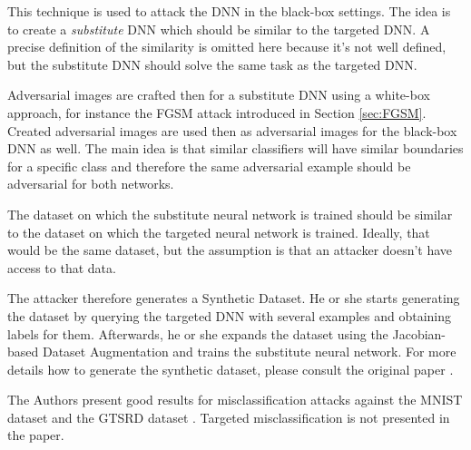 This technique is used to attack the DNN in the black-box settings. The idea is to create a \textit{substitute} DNN which should be similar to the targeted DNN. A precise definition of the similarity is omitted here because it's not well defined, but the substitute DNN should solve the same task as the targeted DNN.

Adversarial images are crafted then for a substitute DNN using a white-box approach, for instance the FGSM attack introduced in Section \ref{sec:FGSM}. Created adversarial images are used then as adversarial images for the black-box DNN as well. The main idea is that similar classifiers will have similar boundaries for a specific class and therefore the same adversarial example should be adversarial for both networks. 

The dataset on which the substitute neural network is trained should be similar to the dataset on which the targeted neural network is trained. Ideally, that would be the same dataset, but the assumption is that an attacker doesn't have access to that data. 

The attacker therefore generates a Synthetic Dataset. He or she starts generating the dataset by querying the targeted DNN with several examples and obtaining labels for them. Afterwards, he or she expands the dataset using the Jacobian-based Dataset Augmentation and trains the substitute neural network. For more details how to generate the synthetic dataset, please consult the original paper  \cite{DBLP:journals/corr/PapernotMGJCS16}.

The Authors present good results for misclassification attacks against the MNIST dataset and the GTSRD dataset \cite{datasetGTSRD}. Targeted misclassification is not presented in the paper.